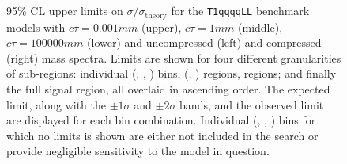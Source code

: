 \begin{figure}[!h]
{    \label{fig:T1qqqqLL_ctau_1_compressed_limitsPerBin}
  } \\
   ~~
   \\
  \caption{ 95\% CL upper limits on $\sigma/\sigma_{\mathrm{theory}}$
    for the \texttt{T1qqqqLL} benchmark models with
    $c\tau=0.001\unit{mm}$ (upper), $c\tau=1\unit{mm}$ (middle),
    $c\tau=100000\unit{mm}$ (lower) and uncompressed (left) and
    compressed (right) mass spectra. Limits are shown for four
    different granularities of sub-regions: individual (\njet, \nb,
    \scalht) bins, (\njet, \nb) regions, \njet regions; and finally
    the full signal region, all overlaid in ascending order. The
    expected limit, along with the $\pm 1\sigma$ and $\pm 2\sigma$
    bands, and the observed limit are displayed for each bin
    combination. Individual (\njet, \nb, \scalht) bins for which no
    limits is shown are either not included in the search or provide
    negligible sensitivity to the model in question.}
  \label{fig:T1qqqqLL_limitsPerBin}
\end{figure}

